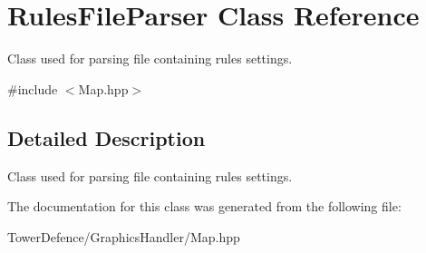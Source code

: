 \hypertarget{class_rules_file_parser}{}\section{Rules\+File\+Parser Class Reference}
\label{class_rules_file_parser}


Class used for parsing file containing rule\textquotesingle{}s settings.  




{\ttfamily \#include $<$Map.\+hpp$>$}



\subsection{Detailed Description}
Class used for parsing file containing rule\textquotesingle{}s settings. 

The documentation for this class was generated from the following file\+:\begin{DoxyCompactItemize}
\item 
Tower\+Defence/\+Graphics\+Handler/Map.\+hpp\end{DoxyCompactItemize}
